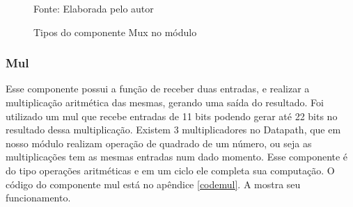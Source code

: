 \begin{figure}[H]
	\caption{Tipos do componente Mux no módulo 	}
	\centering
	\quad %
	\quad %
	
	{Fonte: Elaborada pelo autor}
	\label{fig01}
\end{figure}

\subsubsection{Mul}
Esse componente possui a função de receber duas entradas, e realizar a multiplicação aritmética das mesmas, gerando uma saída do resultado. Foi utilizado um mul que recebe entradas de 11 bits podendo gerar até 22 bits no resultado dessa multiplicação. Existem 3 multiplicadores no Datapath, que em nosso módulo realizam operação de quadrado de um número, ou seja as multiplicações tem as mesmas entradas num dado momento. Esse componente é do tipo operações aritméticas e em um ciclo ele completa sua computação. O código do componente mul está no apêndice \ref{codemul}. A  mostra seu funcionamento.

